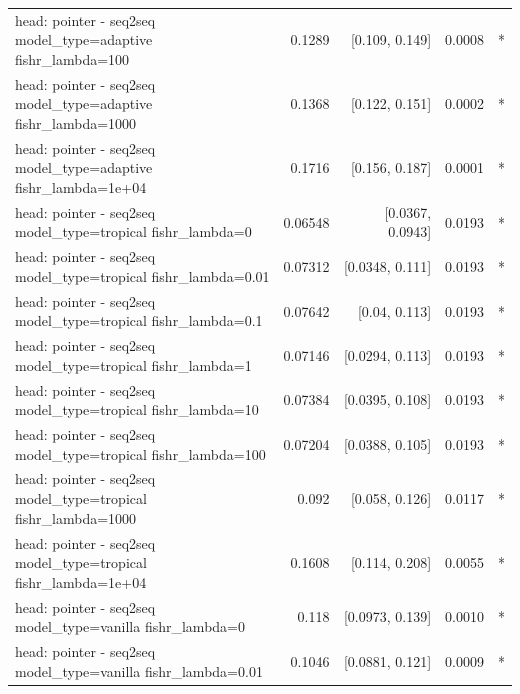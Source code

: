 \documentclass[10pt]{article}
\makeatletter
\newcommand{\stackcell}[1]{\begin{tabular}[t]{@{}l@{}}#1\end{tabular}}
\makeatother
\begin{document}
{\begin{longtable}{lrrrl}
\stackcell{head: pointer - seq2seq\\\footnotesize model\_type=adaptive fishr\_lambda=100 } & 0.1289 & [0.109, 0.149] & 0.0008 & *\\
\stackcell{head: pointer - seq2seq\\\footnotesize model\_type=adaptive fishr\_lambda=1000 } & 0.1368 & [0.122, 0.151] & 0.0002 & *\\
\stackcell{head: pointer - seq2seq\\\footnotesize model\_type=adaptive fishr\_lambda=1e+04 } & 0.1716 & [0.156, 0.187] & 0.0001 & *\\
\stackcell{head: pointer - seq2seq\\\footnotesize model\_type=tropical fishr\_lambda=0 } & 0.06548 & [0.0367, 0.0943] & 0.0193 & *\\
\stackcell{head: pointer - seq2seq\\\footnotesize model\_type=tropical fishr\_lambda=0.01 } & 0.07312 & [0.0348, 0.111] & 0.0193 & *\\
\stackcell{head: pointer - seq2seq\\\footnotesize model\_type=tropical fishr\_lambda=0.1 } & 0.07642 & [0.04, 0.113] & 0.0193 & *\\
\stackcell{head: pointer - seq2seq\\\footnotesize model\_type=tropical fishr\_lambda=1 } & 0.07146 & [0.0294, 0.113] & 0.0193 & *\\
\stackcell{head: pointer - seq2seq\\\footnotesize model\_type=tropical fishr\_lambda=10 } & 0.07384 & [0.0395, 0.108] & 0.0193 & *\\
\stackcell{head: pointer - seq2seq\\\footnotesize model\_type=tropical fishr\_lambda=100 } & 0.07204 & [0.0388, 0.105] & 0.0193 & *\\
\stackcell{head: pointer - seq2seq\\\footnotesize model\_type=tropical fishr\_lambda=1000 } & 0.092 & [0.058, 0.126] & 0.0117 & *\\
\stackcell{head: pointer - seq2seq\\\footnotesize model\_type=tropical fishr\_lambda=1e+04 } & 0.1608 & [0.114, 0.208] & 0.0055 & *\\
\stackcell{head: pointer - seq2seq\\\footnotesize model\_type=vanilla fishr\_lambda=0 } & 0.118 & [0.0973, 0.139] & 0.0010 & *\\
\stackcell{head: pointer - seq2seq\\\footnotesize model\_type=vanilla fishr\_lambda=0.01 } & 0.1046 & [0.0881, 0.121] & 0.0009 & *\\

\end{longtable}}
\end{document}
